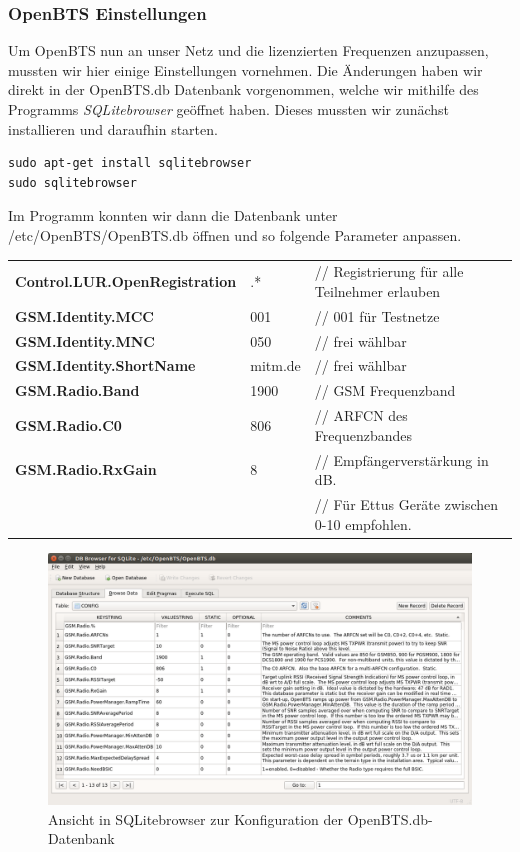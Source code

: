\subsubsection{OpenBTS Einstellungen}
Um OpenBTS nun an unser Netz und die lizenzierten Frequenzen anzupassen, mussten wir hier einige Einstellungen vornehmen. Die Änderungen haben wir direkt in der OpenBTS.db Datenbank vorgenommen, welche wir mithilfe des Programms \textit{SQLitebrowser} geöffnet haben. Dieses mussten wir zunächst installieren und daraufhin starten.
\begin{lstlisting}
sudo apt-get install sqlitebrowser
sudo sqlitebrowser
\end{lstlisting}

Im Programm konnten wir dann die Datenbank unter /etc/OpenBTS/OpenBTS.db öffnen und so folgende Parameter anpassen.
\begin{table}[h]
	\centering
		\begin{tabular}{lll}
			\textbf{Control.LUR.OpenRegistration} & .* & // Registrierung für alle Teilnehmer erlauben\\
			\textbf{GSM.Identity.MCC} & 001 & // 001 für Testnetze\\
			\textbf{GSM.Identity.MNC} & 050 & // frei wählbar\\
			\textbf{GSM.Identity.ShortName} & mitm.de & // frei wählbar\\
			\textbf{GSM.Radio.Band} & 1900 & // GSM Frequenzband\\
			\textbf{GSM.Radio.C0} & 806 & // ARFCN des Frequenzbandes\\
			\textbf{GSM.Radio.RxGain} & 8 & // Empfängerverstärkung in dB.\\
			& & // Für Ettus Geräte zwischen 0-10 empfohlen.\\
		\end{tabular}
\end{table}

\begin{figure}[htbp]
	\centering
		\includegraphics[width=1.0\textwidth]{includes/DB_OpenBts_GSMRadio}
	\caption{Ansicht in SQLitebrowser zur Konfiguration der OpenBTS.db-Datenbank}
	\label{fig:sqlitebrowser}
\end{figure}

